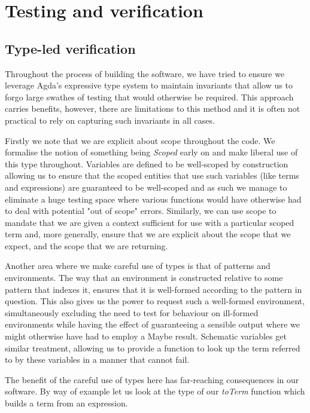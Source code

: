\chapter{Testing and verification}
\label{chapter-testing}
\section{Type-led verification}

Throughout the process of building the software, we have tried to
ensure we leverage Agda's expressive type system to maintain
invariants that allow us to forgo large swathes of testing that would
otherwise be required. This approach carries benefits,
however, there are limitations to this method and it is often not
practical to rely on capturing such invariants in all cases.

Firstly we note that we are explicit about scope throughout the
code. We formalise the notion of something being \emph{Scoped} early
on and make liberal use of this type throughout. Variables are defined
to be well-scoped by construction allowing 
us to ensure that the scoped entities that use such variables (like
terms and expressions) are guaranteed to be well-scoped and as such we
manage to eliminate a huge testing space where various functions would
have otherwise had to deal with potential "out of scope"
errors. Similarly, we can use scope to mandate that we are given a
context sufficient for use with a particular scoped term and, more
generally, ensure that we are explicit about the scope that we expect,
and the scope that we are returning.

Another area where we make careful use of types is that of patterns
and environments. The way that an environment is
constructed relative to some pattern that indexes it, ensures that it
is well-formed according to the pattern in question. This also gives
us the power to request such a well-formed environment, simultaneously
excluding the need to test for behaviour on ill-formed environments
while having the effect of guaranteeing a sensible output where we
might otherwise have had to employ a Maybe result. Schematic variables
get similar treatment, allowing us to provide a function to look
up the term referred to by these variables in a manner that cannot
fail. 

The benefit of the careful use of types here has far-reaching
consequences in our software. By way of example let us look at the
type of our \emph{toTerm} function which builds a term from an expression.

